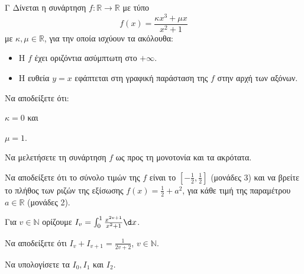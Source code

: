 \begin{thema}{Γ}
Δίνεται η συνάρτηση $f: \mathbb{R} \to \mathbb{R}$ με τύπο
\begin{equation*}
f(x) = \frac{\kappa x^3 + \mu x}{x^2 + 1}
\end{equation*}
με $\kappa, \mu \in \mathbb{R}$, για την οποία ισχύουν τα ακόλουθα:
\begin{itemize}
    \item Η $f$ έχει οριζόντια ασύμπτωτη στο $+\infty$.
    \item Η ευθεία $y = x$ εφάπτεται στη γραφική παράσταση της $f$ στην αρχή των αξόνων.
\end{itemize}
\begin{erwthma}
\item Να αποδείξετε ότι:
\begin{alist}
    \item $\kappa = 0$ και
    \item $\mu = 1$.
\end{alist}
\item 
\begin{alist}
\item Να μελετήσετε τη συνάρτηση $f$ ως προς τη μονοτονία και τα ακρότατα.
\item Να αποδείξετε ότι το σύνολο τιμών της $f$ είναι το $\left[-\frac{1}{2}, \frac{1}{2}\right]$ (μονάδες 3) και να βρείτε το πλήθος των ριζών της εξίσωσης $f(x) = \frac{1}{2} + a^2$, για κάθε τιμή της παραμέτρου $a \in \mathbb{R}$ (μονάδες 2).
\end{alist}
\item Για $v \in \mathbb{N}$ ορίζουμε $I_v = \int_0^1 \frac{x^{2v+1}}{x^2 + 1} \d x$.
\begin{alist}
\item Να αποδείξετε ότι $I_v + I_{v+1} = \frac{1}{2v + 2}$, $v \in \mathbb{N}$.

\item Να υπολογίσετε τα $I_0, I_1$ και $I_2$.
\end{alist}
\end{erwthma}
\end{thema}
 

